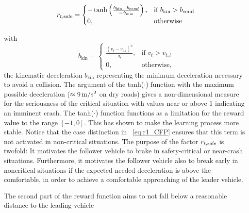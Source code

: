 \documentclass[review]{elsarticle}
\providecommand{\sub}[1]{_{\mathrm{#1}}}  %
\providecommand{\3}{{\ss}}
\begin{document}
	
	\begin{equation}
		\label{eq:r1_CFP}
		r_{t, \rm safe} = 
		\begin{cases}
			-\tanh\left(\frac{b\sub{kin}-b\sub{comf}}{-\dot{v}\sub{min}}\right),& \text{if } b\sub{kin}>b\sub{comf}\\
			0,              & \text{otherwise}
		\end{cases}
	\end{equation}
	
	with
	\begin{equation}
		\label{bkin}
		b\sub{kin} = 
		\begin{cases}
			\frac{(v_t-v_{t,l})^2}{g_t},& \text{if } v_t>v_{t,l}\\
			0,              & \text{otherwise},
		\end{cases}
	\end{equation}
	the kinematic deceleration $b\sub{kin}$ representing the minimum deceleration necessary to avoid a collision.
	The argument of the tanh($\cdot$) function with  the
	maximum possible deceleration ($\approx \unit[9]{m/s^2}$ on dry roads) gives a
	non-dimensional measure for the seriousness of the critical situation
	with values 
	near or above 1 indicating an imminent crash.  The tanh($\cdot$) function functions as a limitation for the reward value to the range $[-1,0]$. This has shown to make the learning process more stable. Notice that the case distinction in ~\eqref{eq:r1_CFP}  ensures that
	this term is not activated in non-critical situations. The purpose of
	the factor $r_{t, \rm safe}$ is twofold: It motivates the follower vehicle to
	brake in safety-critical or near-crash situations.  Furthermore, it motivates the follower vehicle also to break early in noncritical situations if the expected needed deceleration is above the comfortable, in order to achieve a comfortable
	approaching of the leader vehicle.
	
	The second part of the reward function aims to not fall below a reasonable
	distance to the leading vehicle
	
\end{document}

